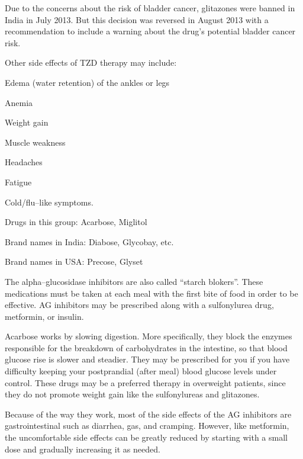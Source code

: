 Due to the concerns about the risk of bladder cancer, glitazones were banned in India in July 2013. But this decision was reversed in August 2013 with a recommendation to include a warning about the drug’s potential bladder cancer risk.

Other side effects of TZD therapy may include:

\item Edema (water retention) of the ankles or legs

 \item Anemia

 \item Weight gain

 \item Muscle weakness

 \item Headaches

 \item Fatigue

 \item Cold/flu–like symptoms.



Drugs in this group: Acarbose, Miglitol

Brand names in India: Diabose, Glycobay, etc.

Brand names in USA: Precose, Glyset

The alpha–glucosidase inhibitors are also called “starch blokers”. These medications must be taken at each meal with the first bite of food in order to be effective. AG inhibitors may be prescribed along with a sulfonylurea drug, metformin, or insulin.

Acarbose works by slowing digestion. More specifically, they block the enzymes responsible for the breakdown of carbohydrates in the intestine, so that blood glucose rise is slower and steadier. They may be prescribed for you if you have difficulty keeping your postprandial (after meal) blood glucose levels under control. These drugs may be a preferred therapy in overweight patients, since they do not promote weight gain like the sulfonylureas and glitazones.

Because of the way they work, most of the side effects of the AG inhibitors are gastrointestinal such as diarrhea, gas, and cramping. However, like metformin, the uncomfortable side effects can be greatly reduced by starting with a small dose and gradually increasing it as needed.

